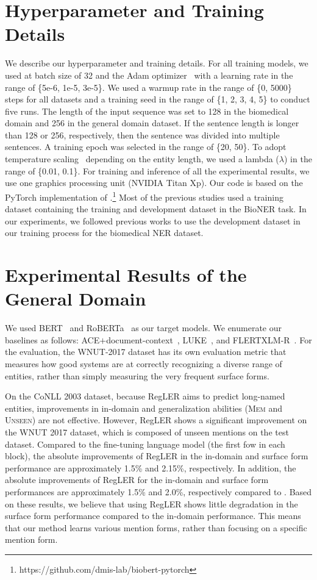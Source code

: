 \documentclass[11pt]{article}
\begin{document}
\section{Hyperparameter and Training Details}
\label{app:hyperparameter}
We describe our hyperparameter and training details.
For all training models, we used at batch size of 32 and the Adam optimizer~\cite{kingma2014adam} with a learning rate in the range of \{5e-6, 1e-5, 3e-5\}.
We used a warmup rate in the range of \{0, 5000\} steps for all datasets and a training seed in the range of \{1, 2, 3, 4, 5\} to conduct five runs.
The length of the input sequence was set to 128 in the biomedical domain and 256 in the general domain dataset. 
If the sentence length is longer than 128 or 256, respectively, then the sentence was divided into multiple sentences.
A training epoch was selected in the range of \{20, 50\}.
To adopt temperature scaling~\cite{guo2017calibration} depending on the entity length, we used a lambda ($\lambda$) in the range of \{0.01, 0.1\}. 
For training and inference of all the experimental results, we use one graphics processing unit (NVIDIA Titan Xp).
Our code is based on the PyTorch implementation of \cite{lee2020biobert}.\footnote{https://github.com/dmis-lab/biobert-pytorch}
Most of the previous studies used a training dataset containing the training and development dataset in the BioNER task. 
In our experiments, we followed previous works to use the development dataset in our training process for the biomedical NER dataset.

\section{Experimental Results of the General Domain}
\label{app:general domain}

We used BERT~\cite{devlin2019bert} and RoBERTa~\cite{liu2019roberta} as our target models.
We enumerate our baselines as follows:
ACE$+$document-context~\cite{wang2020automated}, LUKE~\cite{yamada2020luke}, and FLERTXLM-R~\cite{schweter2020flert}.
For the evaluation, the WNUT-2017 dataset has its own evaluation metric that measures how good systems are at correctly recognizing a diverse range of entities, rather than simply measuring the very frequent surface forms.

On the CoNLL 2003 dataset, because RegLER aims to predict long-named entities, improvements in in-domain and generalization abilities (\textsc{Mem} and \textsc{Unseen}) are not effective.
However, RegLER shows a significant improvement on the WNUT 2017 dataset, which is composed of unseen mentions on the test dataset.
Compared to the fine-tuning language model (the first fow in each block), the absolute improvements of RegLER in the in-domain and surface form performance are approximately 1.5\% and 2.15\%, respectively.
In addition, the absolute improvements of RegLER for the in-domain and surface form performances are approximately 1.5\% and 2.0\%, respectively compared to \cite{kim2021your}. 
Based on these results, we believe that using RegLER shows little degradation in the surface form performance compared to the in-domain performance.
This means that our method learns various mention forms, rather than focusing on a specific mention form.
\end{document}
